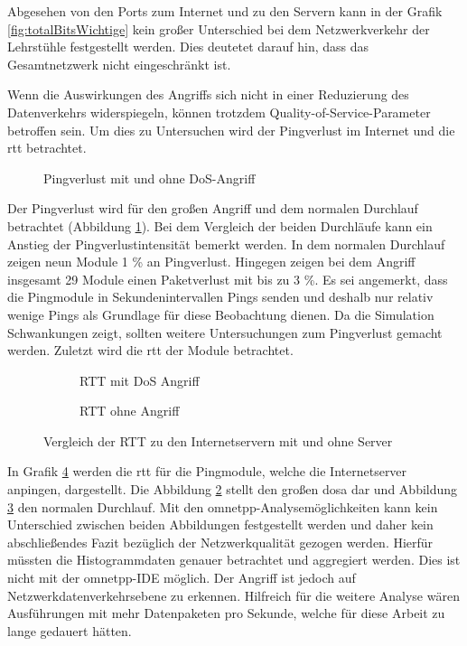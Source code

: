Abgesehen von den Ports zum Internet und zu den Servern kann in der Grafik \ref{fig:totalBitsWichtige} kein großer Unterschied bei dem Netzwerkverkehr der Lehrstühle festgestellt werden. Dies deutetet darauf hin, dass das Gesamtnetzwerk nicht eingeschränkt ist.

Wenn die Auswirkungen des Angriffs sich nicht in einer Reduzierung des Datenverkehrs widerspiegeln, können trotzdem Quality-of-Service-Parameter betroffen sein. Um dies zu Untersuchen wird der Pingverlust im Internet und die \gls{rtt} betrachtet.

\begin{figure}[ht]
	\centering
	
	\caption[Pingverlust mit DoS-Angriff]{Pingverlust mit und ohne DoS-Angriff}
	\label{fig:pingLossLarge}
\end{figure}

Der Pingverlust wird für den großen Angriff und dem normalen Durchlauf betrachtet (Abbildung \ref{fig:pingLossLarge}). Bei dem Vergleich der beiden Durchläufe kann ein Anstieg der Pingverlustintensität bemerkt werden. In dem normalen Durchlauf zeigen neun Module 1 \% an Pingverlust. Hingegen zeigen bei dem Angriff insgesamt 29 Module einen Paketverlust mit bis zu 3 \%. Es sei angemerkt, dass die Pingmodule in Sekundenintervallen Pings senden und deshalb nur relativ wenige Pings als Grundlage für diese Beobachtung dienen. Da die Simulation Schwankungen zeigt, sollten weitere Untersuchungen zum Pingverlust gemacht werden. Zuletzt wird die \gls{rtt} der Module betrachtet.
\begin{figure}[ht]
	\centering
	\begin{subfigure}{0.5\textwidth}
			
			\caption{RTT mit DoS Angriff }
			\label{fig:rTTDosLarge}
	\end{subfigure}%
	\begin{subfigure}{0.5\textwidth}
			
			\caption{RTT ohne Angriff }
			\label{fig:rTTDosNormal}
	\end{subfigure}

	\caption[RTT zu den Internetservern]{Vergleich der RTT zu den Internetservern mit und ohne Server}
	\label{fig:rTTDos}
\end{figure}

In Grafik \ref{fig:rTTDos} werden die \gls{rtt} für die Pingmodule, welche die Internetserver anpingen, dargestellt. Die Abbildung \ref{fig:rTTDosLarge} stellt den großen \gls{dosa} dar und Abbildung \ref{fig:rTTDosNormal} den normalen Durchlauf. Mit den \gls{omnetpp}-Analysemöglichkeiten  kann kein Unterschied zwischen beiden Abbildungen festgestellt werden und daher kein abschließendes Fazit bezüglich der Netzwerkqualität gezogen werden. Hierfür müssten die Histogrammdaten genauer betrachtet und aggregiert werden. Dies ist nicht mit der \gls{omnetpp}-IDE möglich. Der Angriff ist jedoch auf Netzwerkdatenverkehrsebene zu erkennen. Hilfreich für die weitere Analyse wären Ausführungen mit mehr Datenpaketen pro Sekunde, welche für diese Arbeit zu lange gedauert hätten. 

